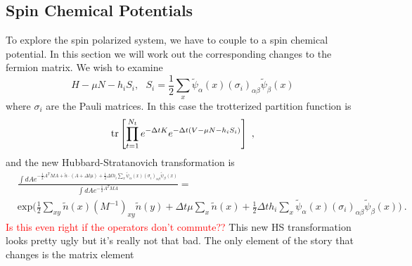 \subsection{Spin Chemical Potentials}
To explore the spin polarized system, we have to couple to a spin chemical potential. In this section we will work out the corresponding changes to the fermion matrix. We wish to examine
\begin{equation*}
H - \mu N - h_i S_i, ~~~ S_i = \frac{1}{2} \sum_x \tilde{\psi}_{\alpha}(x) (\sigma_i)_{\alpha \beta} \tilde{\psi}_{\beta}(x)
\end{equation*}
where $\sigma_i$ are the Pauli matrices. In this case the trotterized partition function is 
\begin{equation}
\text{tr}\left[\prod_{t=1}^{N_t} e^{-\Delta t K }  e^{-\Delta t (V -\mu N-h_i S_i)}  \right]~,
\end{equation}
and the new Hubbard-Stratanovich transformation is 
\begin{align*}
& \frac{\int d {A} e^{-\frac{1}{2} {A}^T M A + \tilde{n} \cdot (A+\Delta t \mu) + \frac{1}{2}  \Delta t h_i \sum_x \tilde{\psi}_{\alpha}(x) (\sigma_i)_{\alpha \beta} \tilde{\psi}_{\beta}(x)  } }{ \int d {A} e^{-\frac{1}{2} {A}^T M A  } } = \\
& \text{exp}\Bigg( \frac{1}{2} \sum_{x y}\tilde{n}(x) (M^{-1})_{xy} \tilde{n}(y) + \Delta t \mu \sum_x \tilde{n}(x) + \frac{1}{2}  \Delta t h_i \sum_x \tilde{\psi}_{\alpha}(x) (\sigma_i)_{\alpha \beta} \tilde{\psi}_{\beta}(x) \Bigg) ~.
\end{align*}
\textcolor{red}{Is this even right if the operators don't commute??} This new HS transformation looks pretty ugly but it's really not that bad. The only element of the story that changes is the matrix element
